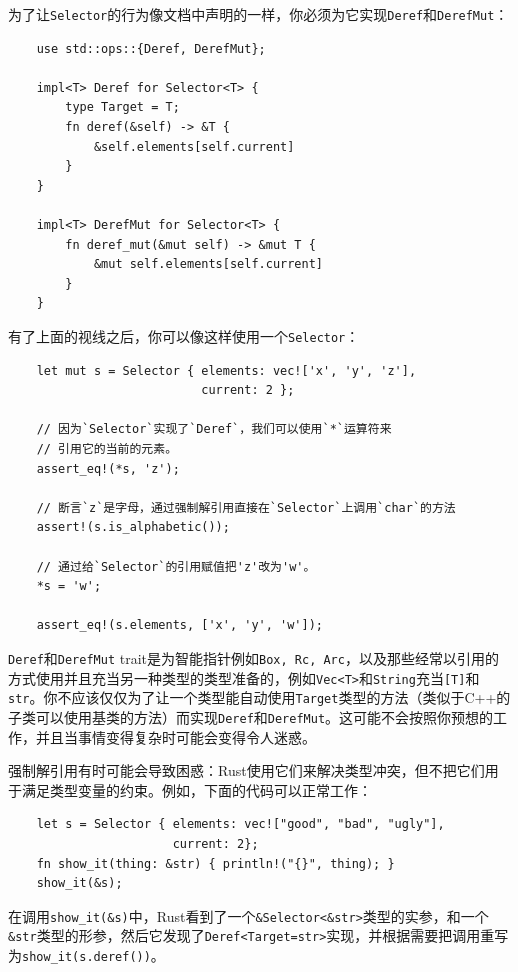 为了让\texttt{Selector}的行为像文档中声明的一样，你必须为它实现\texttt{Deref}和\texttt{DerefMut}：
\begin{verbatim}
    use std::ops::{Deref, DerefMut};

    impl<T> Deref for Selector<T> {
        type Target = T;
        fn deref(&self) -> &T {
            &self.elements[self.current]
        }
    }

    impl<T> DerefMut for Selector<T> {
        fn deref_mut(&mut self) -> &mut T {
            &mut self.elements[self.current]
        }
    }
\end{verbatim}

有了上面的视线之后，你可以像这样使用一个\texttt{Selector}：
\begin{verbatim}
    let mut s = Selector { elements: vec!['x', 'y', 'z'],
                           current: 2 };

    // 因为`Selector`实现了`Deref`，我们可以使用`*`运算符来
    // 引用它的当前的元素。
    assert_eq!(*s, 'z');

    // 断言`z`是字母，通过强制解引用直接在`Selector`上调用`char`的方法
    assert!(s.is_alphabetic());

    // 通过给`Selector`的引用赋值把'z'改为'w'。
    *s = 'w';

    assert_eq!(s.elements, ['x', 'y', 'w']);
\end{verbatim}

\texttt{Deref}和\texttt{DerefMut} trait是为智能指针例如\texttt{Box, Rc, Arc}，以及那些经常以引用的方式使用并且充当另一种类型的类型准备的，例如\texttt{Vec<T>}和\texttt{String}充当\texttt{[T]}和\texttt{str}。你不应该仅仅为了让一个类型能自动使用\texttt{Target}类型的方法（类似于C++的子类可以使用基类的方法）而实现\texttt{Deref}和\texttt{DerefMut}。这可能不会按照你预想的工作，并且当事情变得复杂时可能会变得令人迷惑。

强制解引用有时可能会导致困惑：Rust使用它们来解决类型冲突，但不把它们用于满足类型变量的约束。例如，下面的代码可以正常工作：
\begin{verbatim}
    let s = Selector { elements: vec!["good", "bad", "ugly"],
                       current: 2};
    fn show_it(thing: &str) { println!("{}", thing); }
    show_it(&s);
\end{verbatim}

在调用\texttt{show\_it(\&s)}中，Rust看到了一个\texttt{\&Selector<\&str>}类型的实参，和一个\texttt{\&str}类型的形参，然后它发现了\texttt{Deref<Target=str>}实现，并根据需要把调用重写为\texttt{show\_it(s.deref())}。

